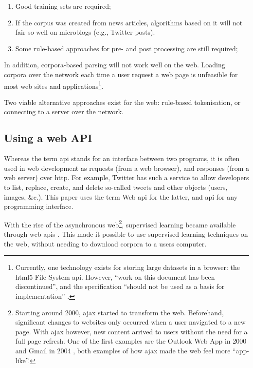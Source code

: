 \begin{enumerate}
\item Good training sets are required;
\item If the corpus was created from news articles, algorithms based on it
  will not fair so well on microblogs (e.g., Twitter posts).
\item Some rule-based approaches for pre- and post processing are still
  required;
\end{enumerate}

In addition, corpora-based parsing will not work well on the web.
Loading corpora over the network each time a user request a web page is
  unfeasible for most web sites and applications\footnote{Currently,
    one technology exists for storing large datasets in a browser: the
    \acrshort{html5} File System \acrshort{api}. However, ``work on this
    document has been discontinued'', and the specification ``should not be
    used as a basis for implementation'' \autocite{urhane-file-api}.}.

Two viable alternative approaches exist for the web: rule-based tokenisation,
  or connecting to a server over the network.

\subsection{Using a web API}\label{using-a-web}

Whereas the term \gls{api} stands for an interface between two programs,
  it is often used in web development as requests (from a web browser),
  and responses (from a web server) over \gls{http}.
For example, Twitter has such a service to allow developers to list,
  replace, create, and delete so-called tweets and other objects (users,
  images, \&c.).
This paper uses the term Web \gls{api} for the latter, and \gls{api} for
any programming interface.

With the rise of the asynchronous web\footnote{Starting around 2000,
    \gls{ajax} started to transform the web.
  Beforehand, significant changes to websites only occurred when a user
    navigated to a new page. 
  With \gls{ajax} however, new content arrived to users without the need
    for a full page refresh. One of the first examples are the Outlook Web
    App in 2000 \autocite{technet-outlook-web-access} and Gmail in 2004
    \autocite{gmailblog-gmail-ajax}, both examples of how \gls{ajax} made
    the web feel more ``app-like''.},
  supervised learning became available through web \glspl{api}
  \autocites{textteaser-web-api}{wordnet-web-api}{textrazor-web-api}.
This made it possible to use supervised learning techniques on the web,
  without needing to download corpora to a users computer.

